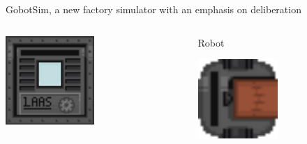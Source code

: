 \begin{frame}{GobotSim, a new factory simulator with an emphasis on deliberation}
\begin{columns}
\begin{column}{0.3\textwidth}
            \includegraphics[width = 0.5\textwidth]{images/godot/machine_texture.png}

        \end{column}
        \begin{column}{0.3\textwidth}
            \centering
            Robot

            \includegraphics[width = 0.5\textwidth]{images/godot/robot_texture.png}
        \end{column}
    \end{columns}

            


\end{frame}

